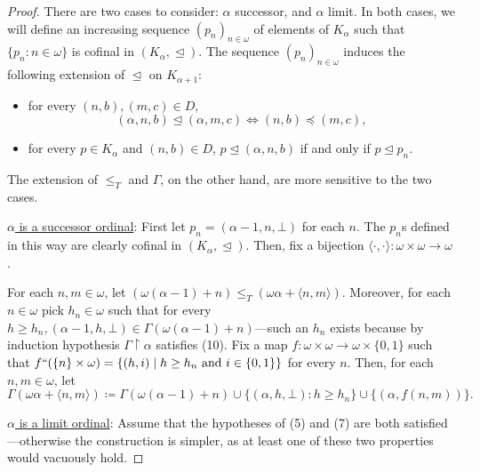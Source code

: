 \documentclass[]{amsart}
\theoremstyle{definition}
\theoremstyle{remark}
\begin{document}
\begin{proof}
There are two cases to consider: $\alpha$ successor, and $\alpha$ limit. In both cases, we will define an increasing sequence $(p_n)_{n\in\omega}$ of elements of $K_\alpha$ such that $\{p_n : n \in\omega\}$ is cofinal in $(K_\alpha, \trianglelefteq)$. The sequence $(p_n)_{n\in\omega}$ induces the following extension of $\trianglelefteq$ on $K_{\alpha+1}$:
\begin{itemize}
\item for every $(n, b), (m,c) \in D$, \[(\alpha, n, b) \trianglelefteq (\alpha, m, c) \iff (n, b) \preceq (m, c),\] 
\item for every $p \in K_\alpha$ and $(n, b) \in D$, $p \trianglelefteq (\alpha, n, b)$ if and only if $p \trianglelefteq p_n$.
\end{itemize}
The extension of $\le_T$ and $\Gamma$, on the other hand, are more sensitive to the two cases.\vspace{0.5em}


\underline{$\alpha$ is a successor ordinal}: First let $p_n = (\alpha-1, n, \bot)$ for each $n$. The $p_n$s defined in this way are clearly cofinal in $(K_\alpha, \trianglelefteq)$. Then, fix a bijection $\langle \cdot, \cdot \rangle: \omega \times \omega \rightarrow \omega$. 

For each $n,m\in\omega$, let $(\omega(\alpha-1)+n) \le_T (\omega\alpha+\langle n,m \rangle)$. Moreover, for each $n \in \omega$ pick $h_n \in \omega$ such that for every $h \ge h_n, (\alpha-1, h, \bot) \in \Gamma(\omega(\alpha-1) + n)$---such an $h_n$ exists because by induction hypothesis $\Gamma \upharpoonright \alpha$ satisfies (10). Fix a map $f: \omega \times \omega \rightarrow \omega \times \{0,1\}$ such that $f``(\{n\} \times \omega) = \{(h, i) \mid h \ge h_n \text{ and } i \in \{0,1\}\}$ for every $n$. 
Then, for each $n,m \in \omega$, let
\begin{equation}\label{eq:main4:defgammasucc}
\Gamma(\omega\alpha + \langle n, m \rangle) \coloneqq \Gamma (\omega(\alpha-1) + n ) \cup \big\{(\alpha, h, \bot) : h \ge h_n\big\} \cup \{(\alpha, f(n,m))\}.
\end{equation}

\vspace{0.5em}
\underline{$\alpha$ is a limit ordinal}: Assume that the hypotheses of (5) and (7) are both satisfied---otherwise the construction is simpler, as at least one of these two properties would vacuously hold.


\end{proof}
\end{document}
